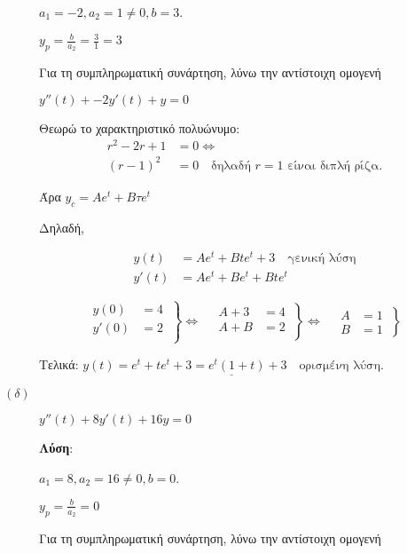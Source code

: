 \documentclass[a4paper,12pt]{article}
\begin{document}
\begin{description}
\vspace{\baselineskip}

$a_1=-2, a_2=1\neq 0, b=3$.

$y_p=\frac{b}{a_2}=\frac{3}{1}=3$

Για τη συμπληρωματική συνάρτηση, λύνω την αντίστοιχη ομογενή

$y''(t)+-2y'(t) +y = 0$

Θεωρώ το χαρακτηριστικό πολυώνυμο:
\begin{align*}
r^2-2r+1&=0 \Leftrightarrow \\
(r-1)^2&=0 \quad \text{δηλαδή $r=1$ είναι διπλή ρίζα}.
\end{align*}

Άρα $y_c=Ae^{t} + Bτe^{t} $

Δηλαδή,

\begin{align*}
y(t) &= Ae^{t} + Bte^{t} +3 \quad \text{γενική λύση} \\
y'(t) &= Ae^{t} + Be^{t} + Bte^t
\end{align*}

\[
  \left.\begin{aligned}
y(0)&=4 \\
y'(0)&=2\\
  \end{aligned}\:\right\}\Leftrightarrow \quad
 \left.\begin{aligned}
A+3&=4\\
A+B&=2\\
  \end{aligned}\:\right\}\Leftrightarrow \quad
 \left.\begin{aligned}
A&=1\\
B&=1
  \end{aligned}\:\right\}
\]


Τελικά: $\underline{y(t) = e^{t}+te^{t} +3 = e^t(1+t) +3 \quad \text{ορισμένη λύση}}$.


\vspace{\baselineskip}

\item [$(\delta)$] $\boxed{y''(t)+8y'(t) +16y=0}$

\textbf{Λύση}:

\vspace{\baselineskip}

$a_1=8, a_2=16\neq 0, b=0$.

$y_p=\frac{b}{a_2}=0$

Για τη συμπληρωματική συνάρτηση, λύνω την αντίστοιχη ομογενή


\end{description}
\end{document}
